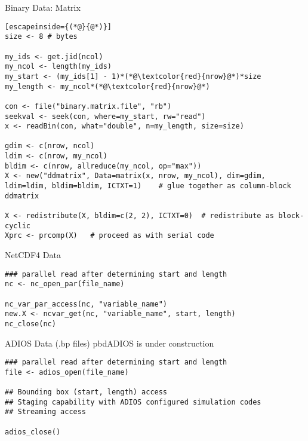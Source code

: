\begin{frame}[fragile]
  \begin{exampleblock}{Binary Data: Matrix}\pause \vspace{-0.8ex}
    \begin{lstlisting}[escapeinside={(*@}{@*)}]
size <- 8 # bytes

my_ids <- get.jid(ncol)
my_ncol <- length(my_ids)
my_start <- (my_ids[1] - 1)*(*@\textcolor{red}{nrow}@*)*size
my_length <- my_ncol*(*@\textcolor{red}{nrow}@*)

con <- file("binary.matrix.file", "rb")
seekval <- seek(con, where=my_start, rw="read")
x <- readBin(con, what="double", n=my_length, size=size)

gdim <- c(nrow, ncol)
ldim <- c(nrow, my_ncol)
bldim <- c(nrow, allreduce(my_ncol, op="max"))
X <- new("ddmatrix", Data=matrix(x, nrow, my_ncol), dim=gdim, ldim=ldim, bldim=bldim, ICTXT=1)    # glue together as column-block ddmatrix

X <- redistribute(X, bldim=c(2, 2), ICTXT=0)  # redistribute as block-cyclic
Xprc <- prcomp(X)   # proceed as with serial code
    \end{lstlisting}
  \end{exampleblock}
\end{frame}

\begin{frame}[fragile]
  \begin{exampleblock}{NetCDF4 Data}\pause \vspace{-0.8ex}
    \begin{lstlisting}
### parallel read after determining start and length
nc <- nc_open_par(file_name)

nc_var_par_access(nc, "variable_name")
new.X <- ncvar_get(nc, "variable_name", start, length)
nc_close(nc)
    \end{lstlisting}
  \end{exampleblock}
  \begin{exampleblock}{ADIOS Data (.bp files) \hfill pbdADIOS is under
    construction}\pause \vspace{-0.8ex}
    \begin{lstlisting}
### parallel read after determining start and length
file <- adios_open(file_name)

## Bounding box (start, length) access
## Staging capability with ADIOS configured simulation codes
## Streaming access

adios_close()
    \end{lstlisting}
  \end{exampleblock}
\end{frame}

